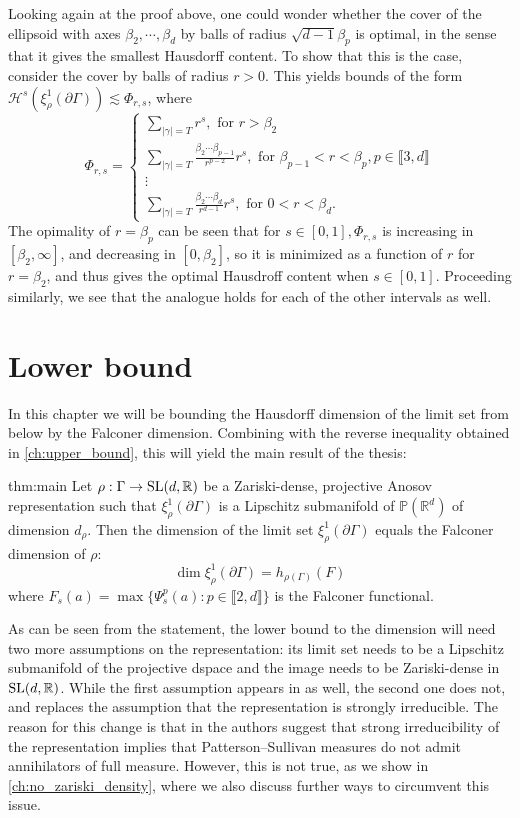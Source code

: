 \documentclass{report}
\begin{document}
Looking again at the proof above, one could wonder whether the cover of the ellipsoid with axes $\beta_2, \cdots, \beta_d$ by balls of radius $\sqrt{d-1} \beta_p$ is optimal, in the sense that it gives the smallest Hausdorff content.
To show that this is the case, consider the cover by balls of radius $r>0$. 
This yields bounds of the form $\mathcal H^s(\xi_\rho^1(\partial \Gamma)) \lesssim \Phi_{r,s}$, where
\[
\Phi_{r,s} = \begin{cases}
    \sum_{|\gamma| = T} r^s, \text{ for } r > \beta_2\\
    \sum_{|\gamma| = T}  \frac{\beta_2 \cdots \beta_{p-1}}{r^{p-2}}  r^s, \text{ for } \beta_{p-1} < r < \beta_p, p \in \llbracket 3, d \rrbracket\\
    \vdots\\
    \sum_{|\gamma| = T}  \frac{\beta_2 \cdots \beta_{d}}{r^{d-1}} r^s, \text{ for } 0 < r < \beta_d.
\end{cases}
\]
The opimality of $r = \beta_p$ can be seen that for $s \in [0,1], \Phi_{r,s}$ is increasing in $[\beta_2, \infty]$, and decreasing in $[0, \beta_2]$, so it is minimized as a function of $r$ for $r = \beta_2$, and thus gives the optimal Hausdroff content when $s \in [0,1]$.
Proceeding similarly, we see that the analogue holds for each of the other intervals as well.

\chapter{Lower bound}\label{ch:lower_bound}
In this chapter we will be bounding the Hausdorff dimension of the limit set from below by the Falconer dimension.
Combining with the reverse inequality obtained in \cref{ch:upper_bound}, this will yield the main result of the thesis:
\begin{reptheorem}{thm:main}
    Let $\rho: \Gamma \to \operatorname{{\mathrm{SL}}}(d, \mathbb R)$ be a Zariski-dense, projective Anosov representation such that $\xi^1_\rho(\partial \Gamma)$ is a Lipschitz submanifold of $\mathbb P(\mathbb R^d)$ of dimension $d_\rho$.
    Then the dimension of the limit set $\xi_\rho^1(\partial \Gamma)$ equals the Falconer dimension of $\rho$:
    \[
        \dim \xi_\rho^1(\partial \Gamma) = h_{\rho(\Gamma)}(F)
    \]
    where $F_s(a) = \max \{ \Psi_s^p(a) : p \in \llbracket 2, d \rrbracket\}$ is the Falconer functional.
\end{reptheorem}
As can be seen from the statement, the lower bound to the dimension will need two more assumptions on the representation: its limit set needs to be a Lipschitz submanifold of the projective dspace and the image needs to be Zariski-dense in $\operatorname{{\mathrm{SL}}}(d, \mathbb R)$.
While the first assumption appears in \cite{pozzetti_anosov_2023} as well, the second one does not, and replaces the assumption that the representation is strongly irreducible.
The reason for this change is that in \cite{pozzetti_anosov_2023} the authors suggest that strong irreducibility of the representation implies that Patterson--Sullivan measures do not admit annihilators of full measure.
However, this is not true, as we show in \cref{ch:no_zariski_density}, where we also discuss further ways to circumvent this issue.
\end{document}
